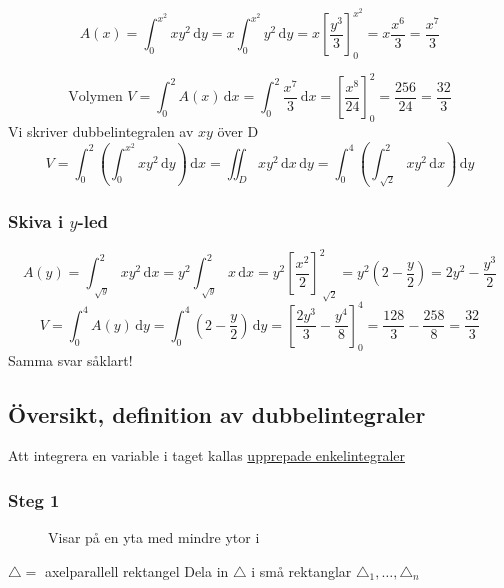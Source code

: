 \documentclass[a4paper]{article}
\let\oldsqrt\sqrt
\renewcommand*{\sqrt}[2][\ ]{\oldsqrt[#1]{#2} }
\begin{document}
$$
	A(x) = \int_0^{x^2}xy^2 \,\mathrm{d}y = x \int_0^{x^2} y^2 \,\mathrm{d}y = x\left[\frac{y^3}{3}\right]^{x^2}_0 = x \frac{x^6}{3} = \frac{x^7}{3}
$$

$$
	\text{Volymen }V = \int_0^2 A(x)\,\mathrm{d}x = \int_0^2 \frac{x^7}{3} \,\mathrm{d}x = \left[\frac{x^8}{24}\right]_0^2 = \frac{256}{24} = \frac{32}{3}
$$
Vi skriver dubbelintegralen av $xy$ över D
$$
	V = \int_0^2\left(\int_0^{x^2} xy^2 \,\mathrm{d}y \right)\,\mathrm{d}x = \iint_D xy^2 \,\mathrm{d}x\,\mathrm{d}y = \int_0^4 \left( \int_{\sqrt{2}}^2 xy^2 \,\mathrm{d}x \right) \,\mathrm{d}y
$$

\subsubsection{Skiva i \texorpdfstring{$y$}{y}-led}

$$
	A(y) = \int_{\sqrt{y}}^2 xy^2 \,\mathrm{d}x = y^2 \int_{\sqrt{y}}^2 x \,\mathrm{d}x = y^2 \left[\frac{x^2}{2}\right]_{\sqrt{2}}^2 = y^2\left(2- \frac{y}{2}\right) = 2y^2 - \frac{y^3}{2}
$$
$$
	V = \int_0^4 A(y) \,\mathrm{d}y = \int_0^4 \left(2- \frac{y}{2}\right)\,\mathrm{d}y = \left[\frac{2y^3}{3} - \frac{y^4}{8}\right]_0^4 = \frac{128}{3} - \frac{258}{8} = \frac{32}{3}
$$
Samma svar såklart!

\newpage
\subsection{Översikt, definition av dubbelintegraler}
Att integrera en variable i taget kallas \underline{upprepade enkelintegraler}
\subsubsection{Steg 1}

\begin{figure}[ht] 
  \caption{Visar på en yta med mindre ytor i} \label{fig:9.3}
\end{figure}

$\triangle =$ axelparallell rektangel \newline
Dela in $\triangle$ i små rektanglar $\triangle_1,\ldots,\triangle_n$ \newline
\end{document}
